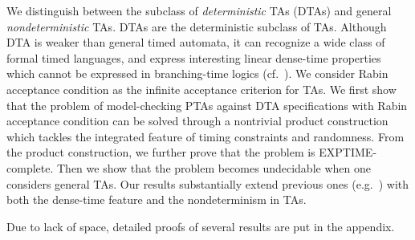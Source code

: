 \smallskip
{} We distinguish between the subclass of \emph{deterministic} TAs (DTAs) and general \emph{nondeterministic} TAs.
DTAs are the deterministic subclass of TAs.
Although DTA is weaker than general timed automata, it can recognize a wide class of formal timed languages, and express interesting linear dense-time properties which cannot be expressed in branching-time logics (cf.~\cite{DBLP:journals/tse/DonatelliHS09}).
We consider Rabin acceptance condition as the infinite acceptance criterion for TAs.
We first show that the problem of model-checking PTAs against DTA specifications with Rabin acceptance condition
can be solved through a nontrivial product construction which tackles the integrated feature of timing constraints and randomness. From the product construction, we further prove that the problem is EXPTIME-complete.
Then we show that the problem becomes undecidable when one considers general TAs.
Our results substantially extend previous ones (e.g.~\cite{DBLP:conf/qest/Sproston11}) with both the dense-time feature and the nondeterminism in TAs.

Due to lack of space, detailed proofs of several results are put in the appendix. 



